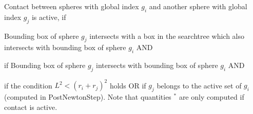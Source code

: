 %
\newcommand{\diffANCF}[1]{\frac{\partial #1}{\partial \qv_{ANCF}}}
\newcommand{\diffANCFt}[1]{\frac{\partial #1}{\partial \dot \qv_{ANCF}}}
\newcommand{\diffANCFmI}[1]{\frac{\partial #1}{\partial \qv_{ANCF,m1}}}
\newcommand{\diffANCFmIt}[1]{\frac{\partial #1}{\partial \dot \qv_{ANCF,m1}}}
\newcommand{\diffmI}[1]{\frac{\partial #1}{\partial \qv_{m1}}}
\newcommand{\diffmIt}[1]{\frac{\partial #1}{\partial \dot \qv_{m1}}}
\newcommand{\diffmO}[1]{\frac{\partial #1}{\partial \qv_{m0}}}
\newcommand{\diffmOt}[1]{\frac{\partial #1}{\partial \dot \qv_{m0}}}
\newcommand{\diffmOI}[1]{\frac{\partial #1}{\partial \qv_{m0,m1}}}
\newcommand{\diffmOIt}[1]{\frac{\partial #1}{\partial \dot \qv_{m0,m1}}}
%
%
\noindent Contact between spheres with global index $g_i$ and another sphere with global index $g_j$ is active, if
\bi
  \item Bounding box of sphere $g_j$ intersects with a box in the searchtree which also intersects with bounding box of sphere $g_i$ AND
  \item if Bounding box of sphere $g_j$ intersects with bounding box of sphere $g_i$ AND
  \item if the condition $L^2 < \left(r_i + r_j\right)^2$ holds OR
  if $g_j$ belongs to the active set of $g_i$ (computed in PostNewtonStep).
\ei
Note that quantities $^*$ are only computed if contact is active.

